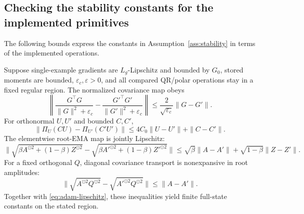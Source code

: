 \subsection{Checking the stability constants for the implemented primitives}

The following bounds express the constants in
Assumption~\ref{ass:stability} in terms of the implemented operations.

\begin{lemma}
\label{lem:building-blocks}
Suppose single-example gradients are $L_g$-Lipschitz and bounded by
$G_0$, stored moments are bounded, $\varepsilon_c,\varepsilon>0$, and
all compared QR/polar operations stay in a fixed regular region.
The normalized covariance map obeys
\begin{equation}
 \left\|\frac{G^\top G}{\|G\|^2+\varepsilon_c}
       -\frac{G'^\top G'}{\|G'\|^2+\varepsilon_c}\right\|
 \le\frac{2}{\sqrt{\varepsilon_c}}\|G-G'\|.\label{eq:cov-lip}
\end{equation}
For orthonormal $U,U'$ and bounded $C,C'$,
\begin{equation}
 \|\Pi_U(CU)-\Pi_{U'}(C'U')\|
 \le4C_0\|U-U'\|+\|C-C'\|.\label{eq:tangent-lip}
\end{equation}
The elementwise root-EMA map is jointly Lipschitz:
\begin{equation}
 \|\sqrt{\beta A^{\odot2}+(1-\beta)Z^{\odot2}}
       -\sqrt{\beta A'^{\odot2}+(1-\beta)Z'^{\odot2}}\|
 \le\sqrt\beta\|A-A'\|+\sqrt{1-\beta}\|Z-Z'\|.
 \label{eq:root-ema}
\end{equation}
For a fixed orthogonal $Q$, diagonal covariance transport is nonexpansive
in root amplitudes:
\begin{equation}
 \|\sqrt{A^{\odot2}Q^{\odot2}}-
                 \sqrt{A'^{\odot2}Q^{\odot2}}\|\le\|A-A'\|.
 \label{eq:root-transport}
\end{equation}
Together with \eqref{eq:adam-lipschitz}, these inequalities yield finite
full-state constants on the stated region.
\end{lemma}

